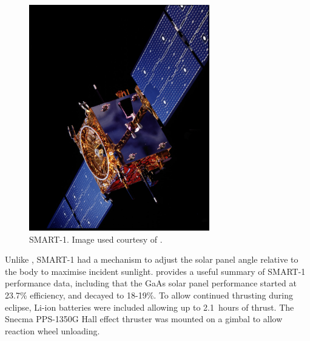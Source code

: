 \begin{figure}[ht]
\centering
\includegraphics [angle=90,width=0.7\textwidth] {Images/SMART-1.jpg}
\caption{SMART-1. Image used courtesy of \textcite{web_SMART-1b}.}
\label{fig:SMART-1}
\end{figure}

Unlike \BW, SMART-1 had a mechanism to adjust the solar panel angle relative to the body to maximise incident sunlight. \textcite{Estublier2007} provides a useful summary of SMART-1 performance data, including that the GaAs solar panel performance started at 23.7\% efficiency, and decayed to 18-19\%. To allow continued thrusting during eclipse, Li-ion batteries were included allowing up to 2.1~hours of thrust. The Snecma PPS-1350G Hall effect thruster was mounted on a gimbal to allow reaction wheel unloading.


